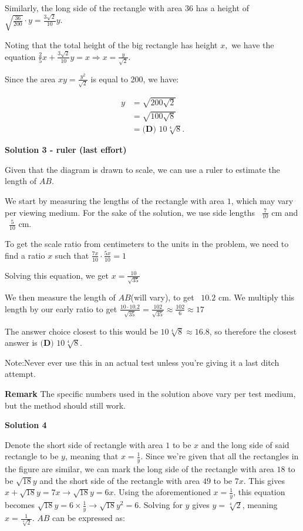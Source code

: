 \begin{enumerate}
 Similarly, the long side of the rectangle with area 36 has a height of $\sqrt{\frac{36}{200}}\cdot y = \frac{3\sqrt{2}}{10}y.$

 Noting that the total height of the big rectangle has height $x,$ we have the equation $\frac25 x + \frac{3\sqrt{2}}{10}y = x \Rightarrow x=\frac{y}{\sqrt{2}}.$

 Since the area $xy=\frac{y^2}{\sqrt{2}}$ is equal to 200, we have:

 
 \begin{align*} y&=\sqrt{200\sqrt{2}} \\ &=\sqrt{100\sqrt{8}} \\ &=\boxed{\textbf{(D) }10\sqrt[4]{8}}. \end{align*}





\textbf{Solution 3 - ruler (last effort)}

Given that the diagram is drawn to scale, we can use a ruler to estimate the length of $AB$. 

 We start by measuring the lengths of the rectangle with area $1$, which may vary per viewing medium. For the sake of the solution, we use side lengths ~$\frac{7}{10}$ cm and ~$\frac{5}{10}$ cm. 

 To get the scale ratio from centimeters to the units in the problem, we need to find a ratio $x$ such that $\frac{7x}{10}\cdot\frac{5x}{10}=1$ 

 Solving this equation, we get $x=\frac{10}{\sqrt{35}}$

 We then measure the length of $AB$(will vary), to get ~$10.2$ cm. We multiply this length by our early ratio to get $\frac{10 \cdot 10.2}{\sqrt{35}} = \frac{102}{\sqrt{35}} \approx \frac{102}{6} \approx 17$

 The answer choice closest to this would be $10\sqrt[4]{8}\approx16.8$, so therefore the closest answer is $\boxed{\textbf{(D) }10\sqrt[4]{8}}$.

 Note:Never ever use this in an actual test unless you're giving it a last ditch attempt.

 \textbf{Remark} The specific numbers used in the solution above vary per test medium, but the method should still work.

 



\textbf{Solution 4}

Denote the short side of rectangle with area $1$ to be $x$ and the long side of said rectangle to be $y$, meaning that $x=\frac{1}{y}$. Since we're given that all the rectangles in the figure are similar, we can mark the long side of the rectangle with area $18$ to be $\sqrt{18}y$ and the short side of the rectangle with area $49$ to be $7x$. This gives $x+\sqrt{18}y=7x \to \sqrt{18}y=6x$. Using the aforementioned $x=\frac{1}{y}$, this equation becomes $\sqrt{18}y=6 \times \frac{1}{y} \to \sqrt{18} y^2=6$. Solving for $y$ gives $y=\sqrt[4]{2}$, meaning $x=\frac{1}{\sqrt[4]{2}}$. $AB$ can be expressed as:


\end{enumerate}
